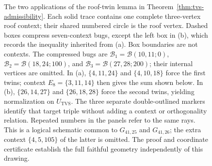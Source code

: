 \documentclass[aps,pra,reprint,superscriptaddress,longbibliography,nofootinbib,floatfix,10pt]{revtex4-2}
\theoremstyle{definition}\newtheorem{definition}[theorem]{Definition}
\theoremstyle{remark}\newtheorem{remark}[theorem]{Remark}
\begin{document}
\begin{figure}[!t]
{%
}
\caption{The two applications of the roof-twin lemma in Theorem~\ref{thm:tvs-admissibility}. Each solid trace contains one complete three-vertex roof context; their shared numbered circle is the roof vertex. Dashed boxes compress seven-context bugs, except the left box in (b), which records the inequality inherited from (a). Box boundaries are not contexts. The compressed bugs are $\mathcal B_1=\mathcal B(10,11;0)$, $\mathcal B_2=\mathcal B(18,24;100)$, and $\mathcal B_3=\mathcal B(27,28;200)$; their internal vertices are omitted. In (a), $\{4,11,24\}$ and $\{4,10,18\}$ force the first twins; context $E_8=\{3,11,14\}$ then gives the sum shown below. In (b), $\{26,14,27\}$ and $\{26,18,28\}$ force the second twins, yielding normalization on $U_{\mathrm{TVS}}$. The three separate double-outlined markers identify that target triple without adding a context or orthogonality relation. Repeated numbers in the panels refer to the same rays. This is a logical schematic common to $G_{41,25}$ and $G_{41,26}$; the extra context $\{4,5,105\}$ of the latter is omitted. The proof and coordinate certificate establish the full faithful geometry independently of this drawing.}\label{fig:TVS-admissibility}
\end{figure}
\end{document}
